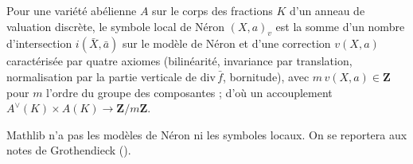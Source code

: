 \begin{encadre}
\begin{theoreme*}\nonverifie
Pour une variété abélienne $A$ sur le corps des fractions $K$ d'un anneau de valuation discrète, le symbole local de Néron $(X, a)_v$ est la somme d'un nombre d'intersection $i(\bar X, \bar a)$ sur le modèle de Néron et d'une correction $v(X, a)$ caractérisée par quatre axiomes (bilinéarité, invariance par translation, normalisation par la partie verticale de $\mathrm{div}\,\bar f$, bornitude), avec $m\,v(X, a) \in \mathbf Z$ pour $m$ l'ordre du groupe des composantes ; d'où un accouplement $A^\vee(K) \times A(K) \to \mathbf Z/m\mathbf Z$.
\end{theoreme*}
\end{encadre}
{\small Mathlib n'a pas les modèles de Néron ni les symboles locaux. On se reportera aux notes de Grothendieck ().\par}
